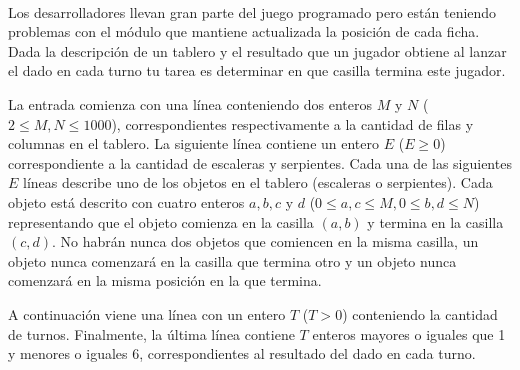 \documentclass{oci}
\begin{document}
\begin{problemDescription}
  \begin{center}
    ~
  \end{center}

  Los desarrolladores llevan gran parte del juego programado pero están teniendo
  problemas con el módulo que mantiene actualizada la posición de cada ficha.
  Dada la descripción de un tablero y el resultado que un jugador obtiene al
  lanzar el dado en cada turno tu tarea es determinar en que casilla termina
  este jugador.
\end{problemDescription}

\begin{inputDescription}
  La entrada comienza con una línea conteniendo dos enteros $M$ y $N$ ($2 \leq
  M, N \leq 1000$), correspondientes respectivamente a la cantidad de filas y
  columnas en el tablero.
  La siguiente línea contiene un entero $E$ ($E \geq 0$) correspondiente a la
  cantidad de escaleras y serpientes.
  Cada una de las siguientes $E$ líneas describe uno de los objetos en el
  tablero (escaleras o serpientes).
  Cada objeto está descrito con cuatro enteros $a, b, c$ y $d$ ($0 \leq a, c
  \leq M, 0 \leq b, d \leq N$)
  representando que el objeto comienza en la casilla $(a, b)$ y termina en la
  casilla $(c, d)$.
  No habrán nunca dos objetos que comiencen en la misma casilla, un objeto
  nunca comenzará en la casilla que termina otro y un objeto nunca comenzará en
  la misma posición en la que termina.

  A continuación viene una línea con un entero $T$ ($T > 0$) conteniendo la
  cantidad de turnos.
  Finalmente, la última línea contiene $T$ enteros mayores o iguales que 1 y
  menores o iguales 6, correspondientes al resultado del dado en cada turno.
\end{inputDescription}
\end{document}
